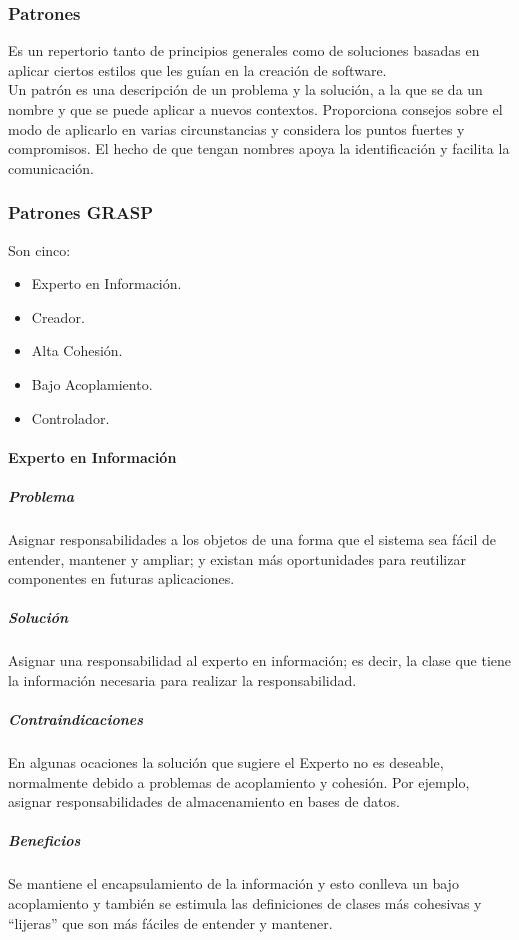 \subsubsection{Patrones}
Es un repertorio tanto de principios generales como de soluciones basadas en aplicar ciertos estilos que les guían en la creación de software.\\
Un patrón es una descripción de un problema y la solución, a la que se da un nombre y que se puede aplicar a nuevos contextos. Proporciona consejos sobre el modo de aplicarlo en varias circunstancias y considera los puntos fuertes y compromisos. El hecho de que tengan nombres apoya la identificación y facilita la comunicación.
\subsubsection{Patrones GRASP}
Son cinco:
\begin{itemize}
\item Experto en Información.
\item Creador.
\item Alta Cohesión.
\item Bajo Acoplamiento.
\item Controlador.
\end{itemize}
\paragraph{Experto en Información}
\subparagraph{Problema}
Asignar responsabilidades a los objetos de una forma que el sistema sea fácil de entender, mantener y ampliar; y existan más oportunidades para reutilizar componentes en futuras aplicaciones.
\subparagraph{Solución}
Asignar una responsabilidad al experto en información; es decir, la clase que tiene la información necesaria para realizar la responsabilidad.
\subparagraph{Contraindicaciones}
En algunas ocaciones la solución que sugiere el Experto no es deseable, normalmente debido a problemas de acoplamiento y cohesión. Por ejemplo, asignar responsabilidades de almacenamiento en bases de datos.
\subparagraph{Beneficios}
Se mantiene el encapsulamiento de la información y esto conlleva un bajo acoplamiento y también se estimula las definiciones de clases más cohesivas y ``lijeras'' que son más fáciles de entender y mantener.
